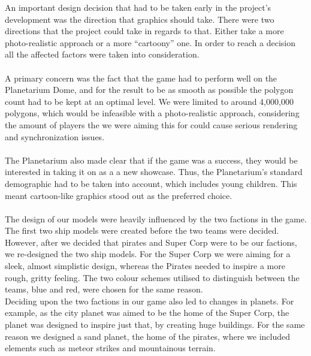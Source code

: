 \documentclass[11pt,a4paper]{article}
\begin{document}
       \noindent
        An important design decision that had to be taken early in the project's development was the direction that graphics should take. There were two directions that the project could take in regards to that. Either take a more photo-realistic approach or a more “cartoony” one. In order to reach a decision all the affected factors were taken into consideration. \\ \\A primary concern was the fact that the game had to perform well on the Planetarium Dome, and for the result to be as smooth as possible the polygon count had to be kept at an optimal level. We were limited to around 4,000,000 polygons, which would be infeasible with a photo-realistic approach, considering the amount of players the we were aiming this for could cause serious rendering and synchronization issues. \\ \\
        \noindent
        The Planetarium also made clear that if the game was a success, they would be interested in taking it on as a a new showcase. Thus, the Planetarium’s standard demographic had to be taken into account, which includes young children. This meant cartoon-like graphics stood out as the preferred choice.  \\ \\
\noindent
        The design of our models were heavily influenced by the two factions in the game. The first two ship models were created before the two teams were decided. However, after we decided that pirates and Super Corp were to be our factions, we re-designed the two ship models. For the Super Corp we were aiming for a sleek, almost simplistic design, whereas the Pirates needed to inspire a more rough, gritty feeling. The two colour schemes utilised to distinguish between the teams, blue and red, were chosen for the same reason. \\ 
\noindent
        Deciding upon the two factions in our game also led to changes in planets. For example, as the city planet was aimed to be the home of the Super Corp, the planet was designed to inspire just that, by creating huge buildings. For the same reason we designed a sand planet, the home of the pirates, where we included elements such as meteor strikes and mountainous terrain. \\ \\

\begin{center}
\end{center}
\end{document}
